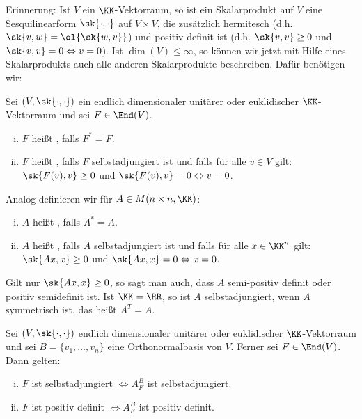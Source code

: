 Erinnerung: Ist $V$ ein $\KK$-Vektorraum, so ist ein Skalarprodukt auf $V$ eine Sesquilinearform $\sk{\cdot,\cdot}$ auf $V \times V$, die zusätzlich hermitesch (d.h. $\sk{v,w} = \ol{\sk{w,v}}$) und positiv definit ist (d.h. $\sk{v,v} \geq 0$ und $\sk{v,v} = 0 \Leftrightarrow v = 0$).
Ist $\dim(V) \leq \infty$, so können wir jetzt mit Hilfe eines Skalarprodukts auch alle anderen Skalarprodukte beschreiben.
Dafür benötigen wir:

\begin{definition}
	\label{def:5.8}
	Sei $(V,\sk{\cdot,\cdot})$ ein endlich dimensionaler unitärer oder euklidischer $\KK$-Vektorraum und sei $F \in \End(V)$.
	\begin{enumerate}[(i)]
		\item $F$ heißt , falls $F^* = F$.
		\item $F$ heißt , falls $F$ selbstadjungiert ist und falls für alle $v \in V$ gilt: $\sk{F(v),v} \geq 0$ und $\sk{F(v),v} = 0 \Leftrightarrow v = 0$.
	\end{enumerate}
	
	Analog definieren wir für $A \in M(n \times n, \KK)$:
	\begin{enumerate}[(i)]
		\item $A$ heißt , falls $A^* = A$.
		\item $A$ heißt , falls $A$ selbstadjungiert ist und falls für alle $x \in \KK^n$ gilt: $\sk{Ax,x} \geq 0$ und $\sk{Ax,x} = 0 \Leftrightarrow x = 0$.
	\end{enumerate}
	
	Gilt nur $\sk{Ax,x} \geq 0$, so sagt man auch, dass $A$ semi-positiv definit oder positiv semidefinit ist.
	Ist $\KK= \RR$, so ist $A$ selbstadjungiert, wenn $A$ symmetrisch ist, das heißt $A^T = A$.
\end{definition}

\begin{lemma}
	\label{lemma:5.9}
	Sei $(V,\sk{\cdot,\cdot})$ endlich dimensionaler unitärer oder euklidischer $\KK$-Vektorraum und sei $B = \{v_1,\dots,v_n\}$ eine Orthonormalbasis von $V$.
	Ferner sei $F \in \End(V)$.
	Dann gelten:
	\begin{enumerate}[(i)]
		\item $F$ ist selbstadjungiert $\Leftrightarrow A^B_F$ ist selbstadjungiert.
		\item $F$ ist positiv definit $\Leftrightarrow A^B_F$ ist positiv definit.
	\end{enumerate}
\end{lemma}

